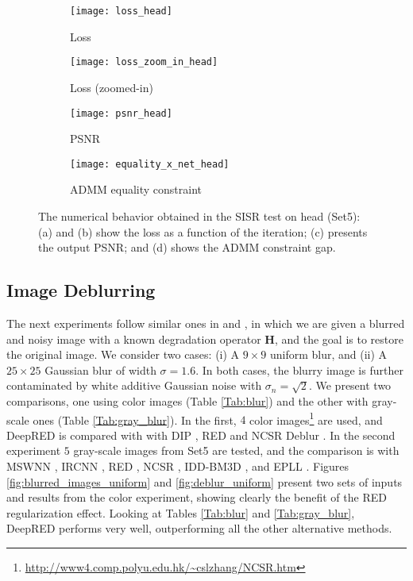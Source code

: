 \documentclass[12pt]{article}
\def\H{{\mathbf H}}
\begin{document}
\begin{figure}[t]
\begin{subfigure}{.5\linewidth}
  \centering
  \texttt{[image: loss\_head]}
  \caption{Loss}
  \label{fig:sfig2}
\end{subfigure}
\begin{subfigure}{.5\linewidth}
  \centering
  \texttt{[image: loss\_zoom\_in\_head]}
  \caption{Loss (zoomed-in)}
  \label{fig:sfig3}
\end{subfigure}

\begin{subfigure}{.5\linewidth}
  \centering
  \texttt{[image: psnr\_head]}
  \caption{PSNR}
  \label{fig:sfig4}
\end{subfigure}
\begin{subfigure}{.5\linewidth}
  \centering
  \texttt{[image: equality\_x\_net\_head]}
  \caption{ADMM equality constraint}
  \label{fig:sfig1}
\end{subfigure}
\caption{The numerical behavior obtained in the SISR test on \textsf{head} (\textsf{Set5}): (a) and (b) show the loss as a function of the iteration; (c) presents the output PSNR; and (d) shows the ADMM constraint gap.}
\label{fig:graphs}
\end{figure}



\subsection{Image Deblurring}

The next experiments follow similar ones in \cite{RED-2017} and \cite{multi}, in which we are given a blurred and noisy image with a known degradation operator $\H$, and the goal is to restore the original image. We consider two cases: (i) A $9 \times 9$ uniform blur, and (ii) A $25 \times 25$ Gaussian blur of width $\sigma=1.6$. In both cases, the blurry image is further contaminated by white additive Gaussian noise with $\sigma_n=\sqrt2$. We present two comparisons, one using color images (Table \ref{Tab:blur}) and the other with gray-scale ones (Table \ref{Tab:gray_blur}). In the first, $4$ color images\footnote{\url{http://www4.comp.polyu.edu.hk/~cslzhang/NCSR.htm}} are used, and DeepRED is compared with with  DIP \cite{DIP-2018}, RED \cite{RED-2017} and NCSR Deblur \cite{NCSR}. In the second experiment  $5$ gray-scale images from \textsf{Set5} are tested, and the comparison is with MSWNN \cite{multi}, IRCNN \cite{IRCNN}, RED \cite{RED-2017}, NCSR \cite{NCSR}, IDD-BM3D \cite{IDD-BM3D}, and EPLL \cite{EPLL}. 
Figures \ref{fig:blurred_images_uniform} and \ref{fig:deblur_uniform} present two sets of inputs and results from the color experiment, showing clearly the benefit of the RED regularization effect. 
Looking at Tables \ref{Tab:blur} and \ref{Tab:gray_blur}, DeepRED performs very well, outperforming all the other alternative methods.
\end{document}
